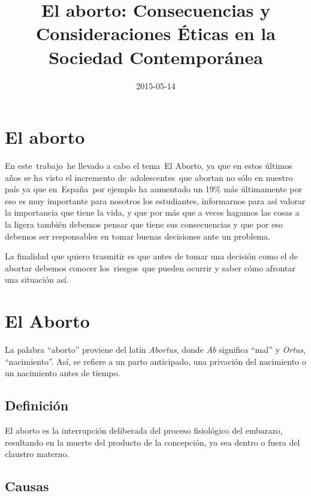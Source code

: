 \documentclass[
  jou,
  floatsintext,
  longtable,
  a4paper,
  nolmodern,
  notxfonts,
  notimes,
  colorlinks=true,linkcolor=blue,citecolor=blue,urlcolor=blue]{apa7}
\title{El aborto: Consecuencias y Consideraciones Éticas en la Sociedad
Contemporánea}
\affiliation{
{Economía, Universidad Nacional de San Cristóbal de Huamanga}}
\date{2015-05-14}
\begin{document}
\maketitle

\hypertarget{toc}{}
\tableofcontents
\newpage
\section[Introduction]{El aborto}

\setcounter{secnumdepth}{-\maxdimen} %

\setlength\LTleft{0pt}


En este~trabajo~he llevado a cabo el tema~El Aborto, ya que en estos
últimos años se ha visto el incremento de~adolescentes~que abortan no
sólo en nuestro país ya que en~España~por ejemplo ha aumentado un 19\%
más últimamente por eso es muy importante para nosotros los estudiantes,
informarnos para así valorar la importancia que tiene la vida, y que por
más que a veces hagamos las cosas a la ligera también debemos pensar que
tiene sus consecuencias y que por eso debemos ser responsables en tomar
buenas decisiones ante un problema.

La finalidad que quiero trasmitir es que antes de tomar una decisión
como el de abortar debemos conocer los~riesgos~que pueden ocurrir y
saber cómo afrontar una situación así.

\section{El Aborto}\label{el-aborto}

La palabra ``aborto'' proviene del latín \emph{Abortus}, donde \emph{Ab}
significa ``mal'' y \emph{Ortus}, ``nacimiento''. Así, se refiere a un
parto anticipado, una privación del nacimiento o un nacimiento antes de
tiempo.

\subsection{Definición}\label{definiciuxf3n}

El aborto es la interrupción deliberada del proceso fisiológico del
embarazo, resultando en la muerte del producto de la concepción, ya sea
dentro o fuera del claustro materno.

\subsection{Causas}\label{causas}
\end{document}
